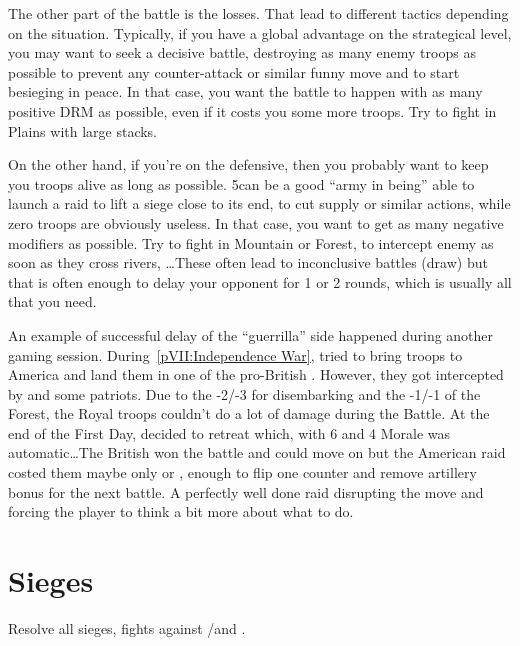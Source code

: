 \begin{playtip}[Losses]
  The other part of the battle is the losses. That lead to different tactics
  depending on the situation. Typically, if you have a global advantage on the
  strategical level, you may want to seek a decisive battle, destroying as
  many enemy troops as possible to prevent any counter-attack or similar funny
  move and to start besieging in peace. In that case, you want the battle to
  happen with as many positive DRM as possible, even if it costs you some more
  troops. Try to fight in Plains with large stacks.

  On the other hand, if you're on the defensive, then you probably want to
  keep you troops alive as long as possible. 5\LD can be a good ``army in
  being'' able to launch a raid to lift a siege close to its end, to cut
  supply or similar actions, while zero troops are obviously useless. In that
  case, you want to get as many negative modifiers as possible. Try to fight
  in Mountain or Forest, to intercept enemy as soon as they cross rivers,
  \ldots These often lead to inconclusive battles (draw) but that is often
  enough to delay your opponent for 1 or 2 rounds, which is usually all that
  you need.

  \smallskip

  An example of successful delay of the ``guerrilla'' side happened during
  another gaming session. During~\ref{pVII:Independence War}, \ANG tried to
  bring troops to America and land them in one of the pro-British
  \COL. However, they got intercepted by  and some
  patriots. Due to the -2/-3 for disembarking and the -1/-1 of the Forest, the
  Royal troops couldn't do a lot of damage during the Battle. At the end of
  the First Day,  decided to retreat which, with 6 \Man and
  4 Morale was automatic\ldots The British won the battle and could move on
  but the American raid costed them maybe only \texttu or \texttd, enough to
  flip one \ARMY counter and remove artillery bonus for the next battle. A
  perfectly well done raid disrupting the \ANG move and forcing the player to
  think a bit more about what to do.
\end{playtip}

\section{Sieges}
\label{chMilitary:Sieges}
Resolve all sieges, fights against \REVOLT/\REBELLION and \corsaire.

